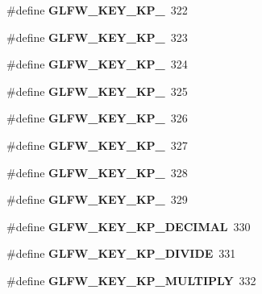 \begin{DoxyCompactItemize}
\mbox{\label{group__keys_gaf82d5a802ab8213c72653d7480c16f13}} 
\#define {\bfseries G\+L\+F\+W\+\_\+\+K\+E\+Y\+\_\+\+K\+P\+\_}~322
\item 
\mbox{\label{group__keys_ga7e25ff30d56cd512828c1d4ae8d54ef2}} 
\#define {\bfseries G\+L\+F\+W\+\_\+\+K\+E\+Y\+\_\+\+K\+P\+\_}~323
\item 
\mbox{\label{group__keys_gada7ec86778b85e0b4de0beea72234aea}} 
\#define {\bfseries G\+L\+F\+W\+\_\+\+K\+E\+Y\+\_\+\+K\+P\+\_}~324
\item 
\mbox{\label{group__keys_ga9a5be274434866c51738cafbb6d26b45}} 
\#define {\bfseries G\+L\+F\+W\+\_\+\+K\+E\+Y\+\_\+\+K\+P\+\_}~325
\item 
\mbox{\label{group__keys_gafc141b0f8450519084c01092a3157faa}} 
\#define {\bfseries G\+L\+F\+W\+\_\+\+K\+E\+Y\+\_\+\+K\+P\+\_}~326
\item 
\mbox{\label{group__keys_ga8882f411f05d04ec77a9563974bbfa53}} 
\#define {\bfseries G\+L\+F\+W\+\_\+\+K\+E\+Y\+\_\+\+K\+P\+\_}~327
\item 
\mbox{\label{group__keys_gab2ea2e6a12f89d315045af520ac78cec}} 
\#define {\bfseries G\+L\+F\+W\+\_\+\+K\+E\+Y\+\_\+\+K\+P\+\_}~328
\item 
\mbox{\label{group__keys_gafb21426b630ed4fcc084868699ba74c1}} 
\#define {\bfseries G\+L\+F\+W\+\_\+\+K\+E\+Y\+\_\+\+K\+P\+\_}~329
\item 
\mbox{\label{group__keys_ga4e231d968796331a9ea0dbfb98d4005b}} 
\#define {\bfseries G\+L\+F\+W\+\_\+\+K\+E\+Y\+\_\+\+K\+P\+\_\+\+D\+E\+C\+I\+M\+AL}~330
\item 
\mbox{\label{group__keys_gabca1733780a273d549129ad0f250d1e5}} 
\#define {\bfseries G\+L\+F\+W\+\_\+\+K\+E\+Y\+\_\+\+K\+P\+\_\+\+D\+I\+V\+I\+DE}~331
\item 
\mbox{\label{group__keys_ga9ada267eb0e78ed2ada8701dd24a56ef}} 
\#define {\bfseries G\+L\+F\+W\+\_\+\+K\+E\+Y\+\_\+\+K\+P\+\_\+\+M\+U\+L\+T\+I\+P\+LY}~332

\end{DoxyCompactItemize}
